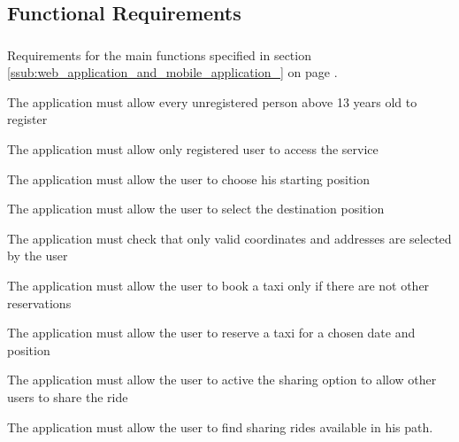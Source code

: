 
\subsection{Functional Requirements} %
\label{sec:functionalrequirement}
\subsubsection{}
Requirements for the main functions specified in section \ref{ssub:web_application_and_mobile_application_} on page \pageref{ssub:web_application_and_mobile_application_}.
\begin{enumerate}[label = \textbf{[FR\arabic*]}]
	\item The application must allow every unregistered person above 13 years old to register
	\item The application must allow only registered user to access the service
	\item The application must allow the user to choose his starting position
	\item The application must allow the user to select the destination position
	\item The application must check that only valid coordinates and addresses  are selected by the user
	\item The application must allow the user to book a taxi only if there are not other reservations
	\item The application must allow the user to reserve a taxi for a chosen  date and position
	\item The application must allow the user to active the sharing option to allow other users to share the ride
	\item The application must allow the user to find sharing rides available in his path. 
\end{enumerate}


